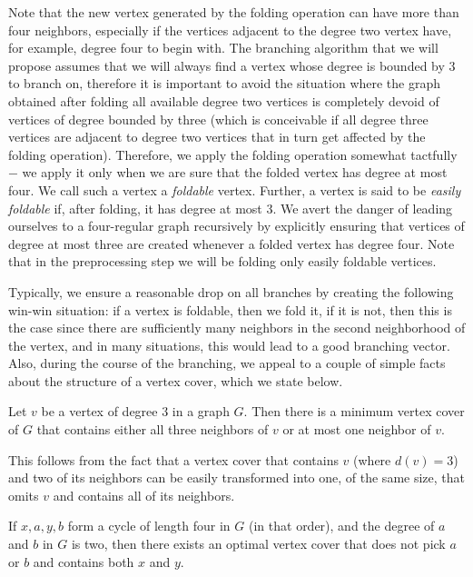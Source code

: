 \documentclass[svgnames]{llncs}
\begin{document}
Note that the new vertex generated by the folding operation can have more than four neighbors, especially if the vertices adjacent to 
the degree two vertex have, for example, degree four to begin with. The branching algorithm that we will propose assumes that we will always find a 
vertex whose degree is bounded by $3$ to branch on, therefore it is important to avoid the situation where the graph obtained after folding all available degree two vertices is completely devoid of vertices of degree bounded by three 
(which is conceivable if all degree three vertices are adjacent to degree two vertices that in turn get affected by the folding operation). 
Therefore, we apply the folding operation somewhat tactfully$-$ we apply it only when we are sure that the folded vertex has degree at most four. We call such a vertex a \emph{foldable} vertex.
Further, a vertex is said to be \emph{easily foldable} if, after folding, it has degree at most $3$.
We avert the danger of leading ourselves to a four-regular graph recursively by explicitly ensuring that vertices of degree at most three are created whenever a folded vertex has degree four.
Note that in the preprocessing step we will be folding only easily foldable vertices.



Typically, we ensure a reasonable drop on all branches by creating the following win-win situation: if a vertex is foldable, then we fold it, if it is not, 
then this is the case since there are sufficiently many neighbors in the second neighborhood of the vertex, and in many situations, this would lead to a good branching vector. Also, during the course of the branching, we appeal to a couple of simple facts about the structure of a vertex cover, which we state below.




\begin{lemma}\cite[First part of Lemma 3.2]{CKJ99}
\label{lem:deg3neighborhood}
Let $v$ be a vertex of degree $3$ in a graph $G$. Then there is a minimum vertex cover
of $G$ that contains either all three neighbors of $v$ or at most one neighbor of $v$.
\end{lemma}



This follows from the fact that a vertex cover that contains $v$ (where $d(v)=3$) and two of its neighbors can be easily transformed into one, of the same size, that omits $v$ and contains all of its neighbors. 

\begin{proposition}
\label{prop:c4}
If $x,a,y,b$ form a cycle of length four in $G$ (in that order), and the degree of $a$ and $b$ in $G$ is two, then there exists an optimal vertex cover that does not pick $a$ or $b$ and contains both $x$ and $y$.
\end{proposition}
\end{document}
